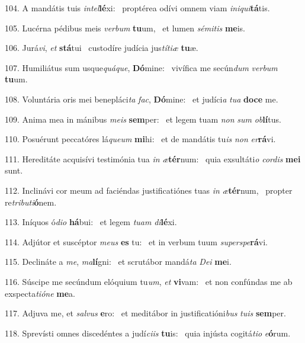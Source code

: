 104. A mandátis tuis \textit{in}\textit{tel}\textbf{lé}xi: \ast\  proptérea odívi omnem viam \textit{in}\textit{i}\textit{qui}\textbf{tá}tis.\

105. Lucérna pédibus meis \textit{ver}\textit{bum} \textbf{tu}um, \ast\  et lumen \textit{sé}\textit{mi}\textit{tis} \textbf{me}is.\

106. Jurá\textit{vi}, \textit{et} \textbf{stá}tui \ast\  custodíre judícia jus\textit{tí}\textit{ti}\textit{æ} \textbf{tu}æ.\

107. Humiliátus sum usque\textit{quá}\textit{que}, \textbf{Dó}mine: \ast\  vivífica me secún\textit{dum} \textit{ver}\textit{bum} \textbf{tu}um.\

108. Voluntária oris mei benepláci\textit{ta} \textit{fac}, \textbf{Dó}mine: \ast\  et judíci\textit{a} \textit{tu}\textit{a} \textbf{do}\textbf{ce} me.\

109. Anima mea in mánibus \textit{me}\textit{is} \textbf{sem}per: \ast\  et legem tuam \textit{non} \textit{sum} \textit{ob}\textbf{lí}tus.\

110. Posuérunt peccatóres lá\textit{que}\textit{um} \textbf{mi}hi: \ast\  et de mandátis tu\textit{is} \textit{non} \textit{er}\textbf{rá}vi.\

111. Hereditáte acquisívi testimónia tua \textit{in} \textit{æ}\textbf{tér}num: \ast\  quia exsultáti\textit{o} \textit{cor}\textit{dis} \textbf{me}\textbf{i} sunt.\

112. Inclinávi cor meum ad faciéndas justificatiónes tuas \textit{in} \textit{æ}\textbf{tér}num, \ast\  propter re\textit{tri}\textit{bu}\textit{ti}\textbf{ó}nem.\

113. Iníquos ó\textit{di}\textit{o} \textbf{há}bui: \ast\  et legem \textit{tu}\textit{am} \textit{di}\textbf{lé}xi.\

114. Adjútor et suscéptor \textit{me}\textit{us} \textbf{es} tu: \ast\  et in verbum tuum \textit{su}\textit{per}\textit{spe}\textbf{rá}vi.\

115. Declináte a \textit{me}, \textit{ma}\textbf{lí}gni: \ast\  et scrutábor mandá\textit{ta} \textit{De}\textit{i} \textbf{me}i.\

116. Súscipe me secúndum elóquium tu\textit{um}, \textit{et} \textbf{vi}vam: \ast\  et non confúndas me ab exspecta\textit{ti}\textit{ó}\textit{ne} \textbf{me}a.\

117. Adjuva me, et \textit{sal}\textit{vus} \textbf{e}ro: \ast\  et meditábor in justificatióni\textit{bus} \textit{tu}\textit{is} \textbf{sem}per.\

118. Sprevísti omnes discedéntes a judí\textit{ci}\textit{is} \textbf{tu}is: \ast\  quia injústa cogitá\textit{ti}\textit{o} \textit{e}\textbf{ó}rum.\

